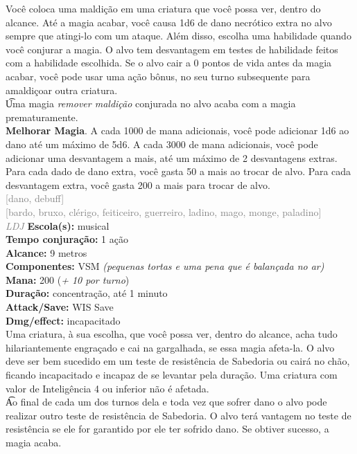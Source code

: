\documentclass{RPG_Adventure}[2021/10/20]
\begin{document}
{\normalsize Você coloca uma maldição em uma criatura que você possa ver, dentro do alcance. Até a magia acabar, você causa 1d6 de dano necrótico extra no alvo sempre que atingi-lo com um ataque. Além disso, escolha uma habilidade quando você conjurar a magia. O alvo tem desvantagem em testes de habilidade feitos com a habilidade escolhida.  Se o alvo cair a 0 pontos de vida antes da magia acabar, você pode usar uma ação bônus, no seu turno subsequente para amaldiçoar outra criatura.\\\t Uma magia \textit{remover maldição} conjurada no alvo acaba com a magia prematuramente.\\\t \textbf{Melhorar Magia}. A cada 1000 de mana adicionais, você pode adicionar 1d6 ao dano até um máximo de 5d6. A cada 3000 de mana adicionais, você pode adicionar uma desvantagem a mais, até um máximo de 2 desvantagens extras. Para cada dado de dano extra, você gasta 50 a mais ao trocar de alvo. Para cada desvantagem extra, você gasta 200 a mais para trocar de alvo.\\}
{\scriptsize \textcolor{gray}{[dano, debuff]\\}}
{\scriptsize \textcolor{gray}{[bardo, bruxo, clérigo, feiticeiro, guerreiro, ladino, mago, monge, paladino]\\}}
{\tiny \textcolor{gray}{\textit{LDJ}}}
{\small \t \textbf{Escola(s):} musical\\\t \textbf{Tempo conjuração:} 1 ação\\\t \textbf{Alcance:} 9 metros\\\t \textbf{Componentes:} VSM \textit{(pequenas tortas e uma pena que é balançada no ar)}\\\t \textbf{Mana:} 200 (\textit{+ 10 por turno})\\\t \textbf{Duração:} concentração, até 1 minuto\\\t \textbf{Attack/Save:} WIS Save\\\t \textbf{Dmg/effect:} incapacitado\\}
{\normalsize Uma criatura, à sua escolha, que você possa ver, dentro do alcance, acha tudo hilariantemente engraçado e cai na gargalhada, se essa magia afeta-la. O alvo deve ser bem sucedido em um teste de resistência de Sabedoria ou cairá no chão, ficando incapacitado e incapaz de se levantar pela duração. Uma criatura com valor de Inteligência 4 ou inferior não é afetada.\\\t Ao final de cada um dos turnos dela e toda vez que sofrer dano o alvo pode realizar outro teste de resistência de Sabedoria. O alvo terá vantagem no teste de resistência se ele for garantido por ele ter sofrido dano. Se obtiver sucesso, a magia acaba.\\}
\end{document}
